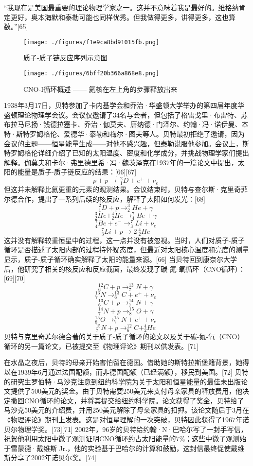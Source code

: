 “我现在是美国最重要的理论物理学家之一。这并不意味着我是最好的。维格纳肯定更好，奥本海默和泰勒可能也同样优秀。但我做得更多，讲得更多，这也算数。”[65]
\begin{figure}[ht]
\centering
\texttt{[image: ./figures/f1e9ca8bd91015fb.png]}
\caption{质子-质子链反应序列示意图} \label{fig_Hans_2}
\end{figure}
\begin{figure}[ht]
\centering
\texttt{[image: ./figures/6bff20b366a868e8.png]}
\caption{CNO-I循环概述 —— 氦核在左上角的步骤释放出来} \label{fig_Hans_3}
\end{figure}
1938年3月17日，贝特参加了卡内基学会和乔治·华盛顿大学举办的第四届年度华盛顿理论物理学会议。会议仅邀请了34名与会者，但包括了格雷戈里·布雷特、苏布拉马尼扬·钱德拉塞卡、乔治·伽莫夫、唐纳德·门泽尔、约翰·冯·诺伊曼、本特·斯特罗姆格伦、爱德华·泰勒和梅尔·图夫等人。贝特最初拒绝了邀请，因为会议的主题——恒星能量生成——对他不感兴趣，但泰勒说服他参加。会议上，斯特罗姆格伦详细介绍了已知的太阳温度、密度和化学成分，并挑战物理学家们提出解释。伽莫夫和卡尔·弗里德里希·冯·魏茨泽克在1937年的一篇论文中提出，太阳的能量是质子-质子链反应的结果：[66][67]
\[ p + p \rightarrow \ ^2_1D + e^+ + \nu_e ~\]
但这并未解释比氦更重的元素的观测结果。会议结束时，贝特与查尔斯·克里奇菲尔德合作，提出了一系列后续的核反应，解释了太阳如何发光：[68]
\[ ^2_1D + p \rightarrow ^3_2He + \gamma~\]
\[ ^3_2He + ^4_2He \rightarrow ^7_4Be + \gamma~\]
\[ ^7_4Be + e^- \rightarrow ^7_3Li + \nu_e~\]
\[ ^7_3Li + p \rightarrow 2 \ ^4_2He~\]
这并没有解释较重恒星中的过程，这一点并没有被忽视。当时，人们对质子-质子循环是否描述了太阳内部的过程持怀疑态度，但最近对太阳核心温度和亮度的测量显示，质子-质子循环确实解释了太阳的能量来源。[66] 当贝特回到康奈尔大学后，他研究了相关的核反应和反应截面，最终发现了碳-氮-氧循环（CNO循环）：[69][70]
\[ ^{12}_6C + p \rightarrow ^{13}_7N + \gamma~\]
\[ ^{13}_7N \rightarrow ^{13}_6C + e^+ + \nu_e~\]
\[ ^{13}_6C + p \rightarrow ^{14}_7N + \gamma~\]
\[ ^{14}_7N + p \rightarrow ^{15}_8O + \gamma~\]
\[ ^{15}_8O \rightarrow ^{15}_7N + e^+ + \nu_e~\]
\[ ^{15}_7N + p \rightarrow ^{12}_6C + ^4_2He~\]
贝特与克里奇菲尔德合著的关于质子-质子循环的论文以及关于碳-氮-氧（CNO）循环的另一篇论文，已被提交至《物理评论》期刊以供发表。[71]

在水晶之夜后，贝特的母亲开始害怕留在德国。借助她的斯特拉斯堡籍背景，她得以在1939年6月通过法国配额，而非德国配额（已经满额），移民到美国。[72] 贝特的研究生罗伯特·马沙克注意到纽约科学院为关于太阳和恒星能量的最佳未出版论文提供了500美元的奖金。由于贝特需要250美元来支付母亲家具的释放费用，他决定撤回CNO循环的论文，并将其提交给纽约科学院。论文获得了奖金，贝特给了马沙克50美元的介绍费，并用250美元解除了母亲家具的扣押。该论文随后于3月在《物理评论》期刊上发表。这是对恒星理解的一次突破，贝特因此获得了1967年诺贝尔物理学奖。[73][71] 2002年，96岁的贝特给约翰·N·巴哈尔写了一封手写信，祝贺他利用太阳中微子观测证明CNO循环约占太阳能量的7\%；这些中微子观测始于雷蒙德·戴维斯 Jr.，他的实验基于巴哈尔的计算和鼓励，这封信最终促使戴维斯分享了2002年诺贝尔奖。[74]

